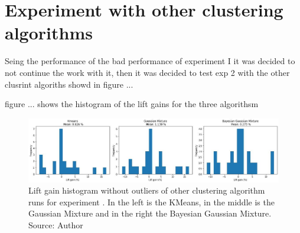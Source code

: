 \section{Experiment \nameExperimentII{} with other clustering algorithms}

Seing the performance of the bad performance of experiment I it was decided to not continue the work with it, then it was decided to test exp 2 with the other clusrint algoriths showd in figure ...

figure ... shows the histogram of the lift gains for the three algorithsm

\begin{figure}[h]
   \centering
   \includegraphics[width=\linewidth]{fig/ch4-other-cluster-algo.jpg}
   \caption{Lift gain histogram without outliers of other clustering algorithm runs for experiment \nameExperimentII{}. In the left is the KMeans, in the middle is the Gaussian Mixture and in the right the Bayesian Gaussian Mixture. Source: Author}
   \label{fig:other-cluster-algo}
\end{figure}

